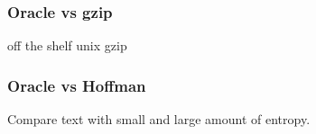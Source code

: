 \documentclass[slidestop,compress,mathserif, xcolor=table]{beamer}
\begin{document}
\begin{frame}
  \frametitle{Oracle vs gzip}
  
  off the shelf unix gzip
\end{frame}

\begin{frame}
  \frametitle{Oracle vs Hoffman}
  Compare text with small and large amount of entropy.
\end{frame}










     



  
  
\end{document}
